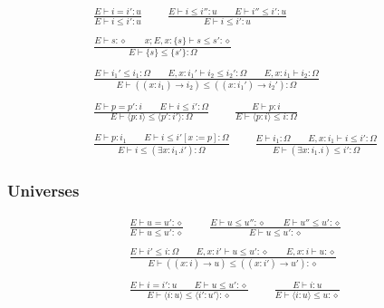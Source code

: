 \documentclass[twoside]{article}
\begin{document}
\begin{displaymath}
\begin{array}{c}
\displaystyle
\frac{
E \vdash i = i' : u
}{
E \vdash i \leq i' : u
}
\qquad
\frac{
E \vdash i \leq i'' : u
\qquad
E \vdash i'' \leq i' : u
}{
E \vdash i \leq i' : u
}
\\\\\displaystyle
\frac{
E \vdash s : \diamond
\qquad
x;E,x:\{s\} \vdash s \leq s' : \diamond
}{
E \vdash \{s\} \leq \{s'\} : \Omega
}
\\\\\displaystyle
\frac{
E \vdash i_1' \leq i_1 : \Omega
\qquad
E,x:i_1' \vdash i_2 \leq i_2' : \Omega
\qquad
E,x:i_1 \vdash i_2 : \Omega
}{
E \vdash ((x:i_1)\to i_2) \leq ((x:i_1')\to i_2') : \Omega
}
\\\\\displaystyle
\frac{
E \vdash p = p' : i
\qquad
E \vdash i \leq i' : \Omega
}{
E \vdash \langle p:i\rangle \leq \langle p':i'\rangle : \Omega
}
\qquad
\frac{
E \vdash p : i
}{
E \vdash \langle p:i\rangle \leq i : \Omega
}
\\\\\displaystyle
\frac{
E \vdash p : i_1
\qquad
E \vdash i \leq i'[x:=p] : \Omega
}{
E \vdash i \leq (\exists x:i_1.i') : \Omega
}
\qquad
\frac{
E \vdash i_1 : \Omega
\qquad
E,x:i_1 \vdash i \leq i' : \Omega
}{
E \vdash (\exists x:i_1.i) \leq i' : \Omega
}
\end{array}
\end{displaymath}


\subsubsection*{Universes \hfill
{}
}

\begin{displaymath}
\begin{array}{c}
\displaystyle
\frac{
E \vdash u = u' : \diamond
}{
E \vdash u \leq u' : \diamond
}
\qquad
\frac{
E \vdash u \leq u'' : \diamond
\qquad
E \vdash u'' \leq u' : \diamond
}{
E \vdash u \leq u' : \diamond
}
\\\\\displaystyle
\frac{
E \vdash i' \leq i : \Omega
\qquad
E,x:i' \vdash u \leq u' : \diamond
\qquad
E,x:i \vdash u : \diamond
}{
E \vdash ((x:i)\to u) \leq ((x:i')\to u') : \diamond
}
\\\\\displaystyle
\frac{
E \vdash i = i' : u
\qquad
E \vdash u \leq u' : \diamond
}{
E \vdash \langle i:u\rangle \leq \langle i':u'\rangle : \diamond
}
\qquad
\frac{
E \vdash i : u
}{
E \vdash \langle i:u\rangle \leq u : \diamond
}
\end{array}
\end{displaymath}
\end{document}
